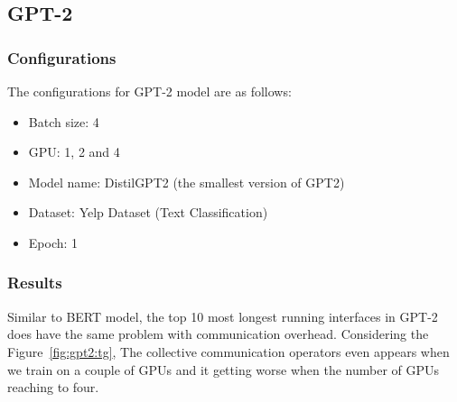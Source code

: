 \subsection{GPT-2}

\subsubsection{Configurations}

The configurations for GPT-2 model are as follows:

\begin{itemize}
    \item Batch size: 4
    \item GPU: 1, 2 and 4
    \item Model name: DistilGPT2 (the smallest version of GPT2)
    \item Dataset: Yelp Dataset (Text Classification)
    \item Epoch: 1
\end{itemize}

\subsubsection{Results}

Similar to BERT model, the top 10 most longest running interfaces in GPT-2 does have the same problem with communication overhead. Considering the Figure~\ref{fig:gpt2:tg}, The collective communication operators even appears when we train on a couple of GPUs and it getting worse when the number of GPUs reaching to four.

